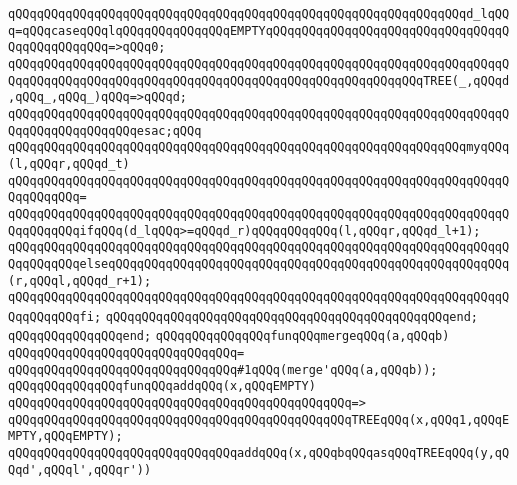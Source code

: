 \verb|qQQqqQQqqQQqqQQqqQQqqQQqqQQqqQQqqQQqqQQqqQQqqQQqqQQqqQQqqQQqqQQqd_lqQQq=qQQqcaseqQQqlqQQqqQQqqQQqqQQqEMPTYqQQqqQQqqQQqqQQqqQQqqQQqqQQqqQQqqQQqqQQqqQQqqQQq=>qQQq0;|\newline
\verb|qQQqqQQqqQQqqQQqqQQqqQQqqQQqqQQqqQQqqQQqqQQqqQQqqQQqqQQqqQQqqQQqqQQqqQQqqQQqqQQqqQQqqQQqqQQqqQQqqQQqqQQqqQQqqQQqqQQqqQQqqQQqqQQqTREE(_,qQQqd,qQQq_,qQQq_)qQQq=>qQQqd;|\newline
\verb|qQQqqQQqqQQqqQQqqQQqqQQqqQQqqQQqqQQqqQQqqQQqqQQqqQQqqQQqqQQqqQQqqQQqqQQqqQQqqQQqqQQqqQQqesac;qQQq|\newline
\newline
\verb|qQQqqQQqqQQqqQQqqQQqqQQqqQQqqQQqqQQqqQQqqQQqqQQqqQQqqQQqqQQqqQQqmyqQQq(l,qQQqr,qQQqd_t)|\newline
\verb|qQQqqQQqqQQqqQQqqQQqqQQqqQQqqQQqqQQqqQQqqQQqqQQqqQQqqQQqqQQqqQQqqQQqqQQqqQQqqQQq=|\newline
\verb|qQQqqQQqqQQqqQQqqQQqqQQqqQQqqQQqqQQqqQQqqQQqqQQqqQQqqQQqqQQqqQQqqQQqqQQqqQQqqQQqifqQQq(d_lqQQq>=qQQqd_r)qQQqqQQqqQQq(l,qQQqr,qQQqd_l+1);|\newline
\verb|qQQqqQQqqQQqqQQqqQQqqQQqqQQqqQQqqQQqqQQqqQQqqQQqqQQqqQQqqQQqqQQqqQQqqQQqqQQqqQQqelseqQQqqQQqqQQqqQQqqQQqqQQqqQQqqQQqqQQqqQQqqQQqqQQqqQQqqQQq(r,qQQql,qQQqd_r+1);|\newline
\verb|qQQqqQQqqQQqqQQqqQQqqQQqqQQqqQQqqQQqqQQqqQQqqQQqqQQqqQQqqQQqqQQqqQQqqQQqqQQqqQQqfi;|\newline
\verb|qQQqqQQqqQQqqQQqqQQqqQQqqQQqqQQqqQQqqQQqqQQqqQQqend;|\newline
\verb|qQQqqQQqqQQqqQQqend;|\newline
\newline
\newline
\verb|qQQqqQQqqQQqqQQqfunqQQqmergeqQQq(a,qQQqb)|\newline
\verb|qQQqqQQqqQQqqQQqqQQqqQQqqQQqqQQq=|\newline
\verb|qQQqqQQqqQQqqQQqqQQqqQQqqQQqqQQq#1qQQq(merge'qQQq(a,qQQqb));|\newline
\newline
\newline
\verb|qQQqqQQqqQQqqQQqfunqQQqaddqQQq(x,qQQqEMPTY)|\newline
\verb|qQQqqQQqqQQqqQQqqQQqqQQqqQQqqQQqqQQqqQQqqQQqqQQq=>|\newline
\verb|qQQqqQQqqQQqqQQqqQQqqQQqqQQqqQQqqQQqqQQqqQQqqQQqTREEqQQq(x,qQQq1,qQQqEMPTY,qQQqEMPTY);|\newline
\newline
\verb|qQQqqQQqqQQqqQQqqQQqqQQqqQQqqQQqaddqQQq(x,qQQqbqQQqasqQQqTREEqQQq(y,qQQqd',qQQql',qQQqr'))|\newline

